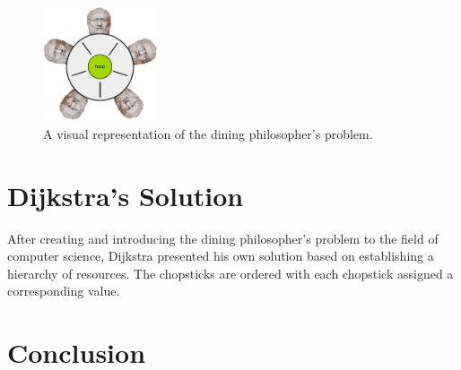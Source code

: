\documentclass{article}
\begin{document}
\begin{figure}[H]
\begin{center}
\includegraphics[width=0.3\textwidth]{diningphilosophers.jpg}
\caption{A visual representation of the dining philosopher's problem.}
\end{center}
\end{figure}

\section{Dijkstra's Solution} After creating and introducing the dining philosopher's problem to the field of computer science, Dijkstra presented his own solution based on establishing a hierarchy of resources. The chopsticks are ordered with each chopstick assigned a corresponding value.

\section{Conclusion}

\begin{thebibliography}{100}

\end{thebibliography}
\end{document}
